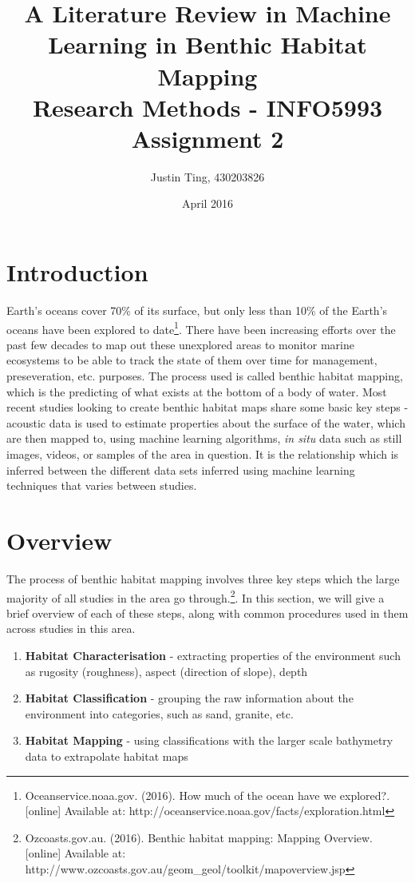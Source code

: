 \documentclass[12pt]{article}
\title{A Literature Review in Machine Learning in Benthic Habitat Mapping \\ Research Methods - INFO5993 Assignment 2}
\author{Justin Ting, 430203826}
\date{April 2016}
\begin{document}
\maketitle

           \section{Introduction}

            Earth's oceans cover 70\% of its surface, but only less than 10\% of the Earth's oceans have been explored to date\footnote{Oceanservice.noaa.gov. (2016). How much of the ocean have we explored?. [online] Available at: http://oceanservice.noaa.gov/facts/exploration.html}. There have been increasing efforts over the past few decades to map out these unexplored areas to monitor marine ecosystems to be able to track the state of them over time for management, preseveration, etc. purposes. The process used is called benthic habitat mapping, which is the predicting of what exists at the bottom of a body of water. Most recent studies looking to create benthic habitat maps share some basic key steps - acoustic data is used to estimate properties about the surface of the water, which are then mapped to, using machine learning algorithms, \textit{in situ} data such as still images, videos, or samples of the area in question. It is the relationship which is inferred between the different data sets inferred using machine learning techniques that varies between studies.

           \section{Overview}
            The process of benthic habitat mapping involves three key steps which the large majority of all studies in the area go through.\footnote{Ozcoasts.gov.au. (2016). Benthic habitat mapping: Mapping Overview. [online] Available at: http://www.ozcoasts.gov.au/geom\_geol/toolkit/mapoverview.jsp}. In this section, we will give a brief overview of each of these steps, along with common procedures used in them across studies in this area.

            \begin{enumerate}
                \item \textbf{Habitat Characterisation} - extracting properties of the environment such as rugosity (roughness), aspect (direction of slope), depth
                \item \textbf{Habitat Classification} - grouping the raw information about the environment into categories, such as sand, granite, etc.
                \item \textbf{Habitat Mapping} - using classifications with the larger scale bathymetry data to extrapolate habitat maps 
            \end{enumerate}
\end{document}
